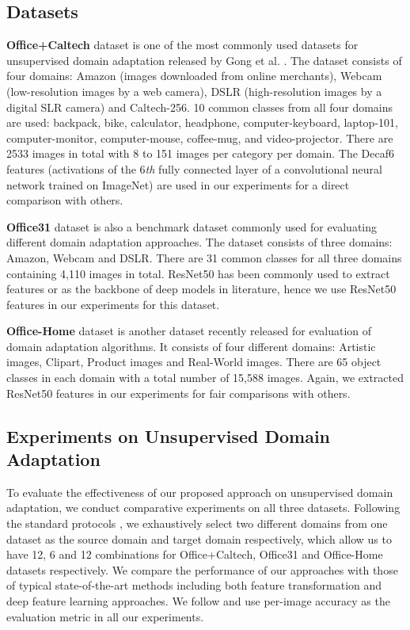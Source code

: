 \documentclass[conference]{IEEEtran}
\begin{document}
\subsection{Datasets}\label{sec:dataset}
\textbf{Office+Caltech} dataset is one of the most commonly used datasets for unsupervised domain adaptation released by Gong et al. \cite{gong2012geodesic}. The dataset consists of four domains: Amazon (images downloaded from online merchants), Webcam (low-resolution images by a web camera), DSLR (high-resolution images by a digital SLR camera) and Caltech-256.  10 common classes from all four domains are used: backpack, bike, calculator, headphone, computer-keyboard, laptop-101, computer-monitor, computer-mouse, coffee-mug, and video-projector. There are 2533 images in total with 8 to 151 images per category per domain. The Decaf6 \cite{donahue2014decaf} features (activations of the 6\textit{th} fully connected layer of a convolutional neural network trained on ImageNet) are used in our experiments for a direct comparison with others.

\textbf{Office31} dataset \cite{saenko2010adapting} is also a benchmark dataset commonly used for evaluating different domain adaptation approaches. The dataset consists of three domains: Amazon, Webcam and DSLR. There are 31 common classes for all three domains containing 4,110 images in total. ResNet50 \cite{he2016deep} has been commonly used to extract features or as the backbone of deep models in literature, hence we use ResNet50 features in our experiments for this dataset.

\textbf{Office-Home} dataset \cite{venkateswara2017deep} is another dataset recently released for evaluation of domain adaptation algorithms. It consists of four different domains: Artistic images, Clipart, Product images and Real-World images. There are 65 object classes in each domain with a total number of 15,588 images. Again, we extracted ResNet50  features in our experiments for fair comparisons with others.


\subsection{Experiments on Unsupervised Domain Adaptation}\label{sec:exp_uda}
To evaluate the effectiveness of our proposed approach on unsupervised domain adaptation, we conduct comparative experiments on all three datasets. Following the standard protocols \cite{gong2012geodesic, wang2018visual}, we exhaustively select two different domains from one dataset as the source domain and target domain respectively, which allow us to have 12, 6 and 12 combinations for Office+Caltech, Office31 and Office-Home datasets respectively. We compare the performance of our approaches with those of typical state-of-the-art methods including both feature transformation and deep feature learning approaches. We follow \cite{wang2018visual} and use per-image accuracy as the evaluation metric in all our experiments.
\end{document}
